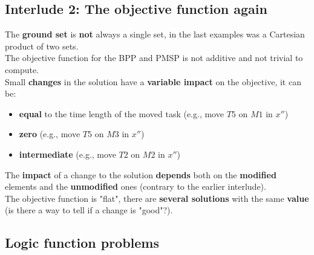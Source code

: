 \newpage

\subsection*{Interlude 2: The objective function again}
The \textbf{ground set} is \textbf{not} always a single set, in the last examples was a Cartesian product of two sets. \\

The objective function for the BPP and PMSP is not additive and not trivial to compute. \\

Small \textbf{changes} in the solution have a \textbf{variable impact} on the objective, it can be: 
\begin{itemize}
	\item \textbf{equal} to the time length of the moved task (e.g., move $T5$ on $M1$ in $x''$)
	\item \textbf{zero} (e.g., move $T5$ on $M3$ in $x''$)
	\item \textbf{intermediate} (e.g., move $T2$ on $M2$ in $x''$)
\end{itemize}
The \textbf{impact} of a change to the solution \textbf{depends} both on the \textbf{modified} elements and the \textbf{unmodified} ones (contrary to the earlier interlude).\\

The objective function is "flat", there are \textbf{several solutions} with the same \textbf{value} (is there a way to tell if a change is "good"?).\\

\newpage

\subsection{Logic function problems}
